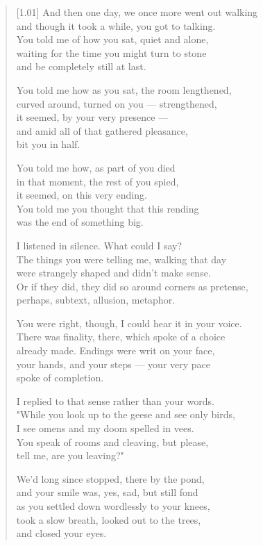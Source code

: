 \begin{verse}[1.01\textwidth]
And then one day, we once more went out walking\\
and though it took a while, you got to talking.\\
You told me of how  you sat, quiet and alone,\\
waiting for the time you might turn to stone\\
and be completely still at last.

You told me how as you sat, the room lengthened,\\
curved around, turned on you --- strengthened,\\
it seemed, by your very presence ---\\
and amid all of that gathered pleasance,\\
bit you in half.

You told me how, as part of you died\\
in that moment, the rest of you spied,\\
it seemed, on this very ending.\\
You told me you thought that this rending\\
was the end of something big.

I listened in silence. What could I say?\\
The things you were telling me, walking that day\\
were strangely shaped and didn't make sense.\\
Or if they did, they did so around corners as pretense,\\
perhaps, subtext, allusion, metaphor.

You were right, though, I could hear it in your voice.\\
There was finality, there, which spoke of a choice\\
already made. Endings were writ on your face,\\
your hands, and your steps --- your very pace\\
spoke of completion.

I replied to that sense rather than your words.\\
"While you look up to the geese and see only birds,\\
I see omens and my doom spelled in vees.\\
You speak of rooms and cleaving, but please,\\
tell me, are you leaving?"

We'd long since stopped, there by the pond,\\
and your smile was, yes, sad, but still fond\\
as you settled down wordlessly to your knees,\\
took a slow breath, looked out to the trees,\\
and closed your eyes.


\end{verse}
